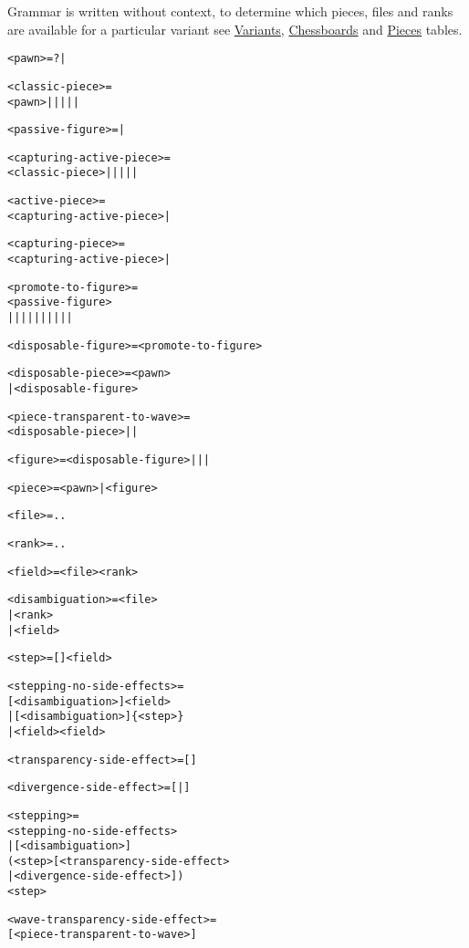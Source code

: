 Grammar is written without context, to determine which pieces, files and ranks
are available for a particular variant see
\hyperref[tbl:Appendix/Introduction/Variants]{Variants},
\hyperref[tbl:Appendix/Introduction/Chessboards]{Chessboards} and
\hyperref[tbl:Appendix/Introduction/Pieces]{Pieces} tables.

\clearpage %

\begin{alltt}
<pawn> = ? | 

<classic-piece> =
  <pawn> |  |  |  |  | 

<passive-figure> =  | 

<capturing-active-piece> =
  <classic-piece> |  |  |  |  | 

<active-piece> =
  <capturing-active-piece> | 

<capturing-piece> =
  <capturing-active-piece> | 

<promote-to-figure> =
  <passive-figure>
|  |  |  |  |  |  |  |  |  | 

<disposable-figure> = <promote-to-figure>

<disposable-piece> = <pawn>
                   | <disposable-figure>

<piece-transparent-to-wave> =
  <disposable-piece> |  | 

<figure> = <disposable-figure> |  |  | 

<piece> = <pawn> | <figure>
\end{alltt}

\clearpage %

\begin{alltt}
<file> =  .. 

<rank> =  .. 

<field> = <file><rank>

<disambiguation> = <file>
                 | <rank>
                 | <field>

<step> = []<field>

<stepping-no-side-effects> =
  [<disambiguation>]<field>
| [<disambiguation>]\{<step>\}
| <field>\alg{-}<field>

<transparency-side-effect> = \alg{\^{}}[]

<divergence-side-effect> = \alg{/}[|]

<stepping> =
  <stepping-no-side-effects>
| [<disambiguation>]
  (<step>[<transparency-side-effect>
          | <divergence-side-effect>])
  <step>

<wave-transparency-side-effect> =
  \alg{\^{}}[<piece-transparent-to-wave>]
\end{alltt}

